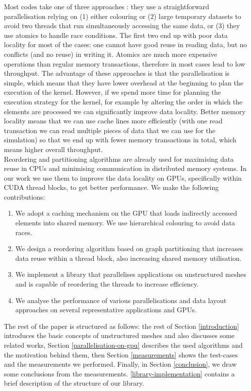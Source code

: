 Most codes take one of three approaches \cite{LULESH:spec,miniaero}: they use a straightforward parallelisation
relying on (1) either colouring or (2) large temporary datasets to avoid two threads
that run simultaneously accessing the same data, or (3) they use atomics to handle race conditions. The first two end up with poor
data locality for most of the cases: one cannot have good reuse in reading
data, but no conflicts (and no reuse) in writing it. Atomics are much more expensive operations than regular memory transactions, therefore in most cases lead to low throughput. The advantage of these
approaches is that the parallelisation is simple, which means that they have lower
overhead at the beginning to plan the execution of the kernel. However, if we
spend more time for planning the execution strategy for the kernel, for example
by altering the order in which the elements are processed we can significantly
improve data locality. Better memory locality means that we can use cache lines
more efficiently (with one read transaction we can read multiple pieces of data
that we can use for the simulation) so that we end up with fewer memory
transactions in total, which means higher overall throughput.\\
Reordering and partitioning algorithms are already used for maximising data
reuse in CPUs and minimising communication in distributed memory systems. In
our work we use them to improve the data locality on GPUs, specifically within
CUDA thread blocks, to get better performance. We make the following
contributions:
\begin{enumerate}
  \item
    We adopt a caching mechanism on the GPU that loads indirectly accessed
    elements into shared memory. We use hierarchical colouring to avoid data
    races.
  \item
    We design a reordering algorithm based on graph partitioning that increases data
    reuse within a thread block, also increasing shared memory utilisation.
  \item
    We implement a library that parallelises applications on unstructured meshes
    and is capable of reordering the threads to increase efficiency.
  \item
    We analyse the performance of various parallelisations and data layout
    approaches on several representative applications and GPUs.
\end{enumerate}
The rest of the paper is structured as follows: the rest of Section
\ref{introduction} introduces the basic concepts of unstructured meshes and
also discusses some related works, Section \ref{parallelisation-on-gpu}
describes the used algorithms and the motivation behind them, then Section
\ref{measurements} shows the test-cases and the measurements we performed.
Finally, in Section \ref{conclusion}, we draw some conclusions from the
measurements. \ref{library-implementation} contains a brief
description of the structure of our library.

